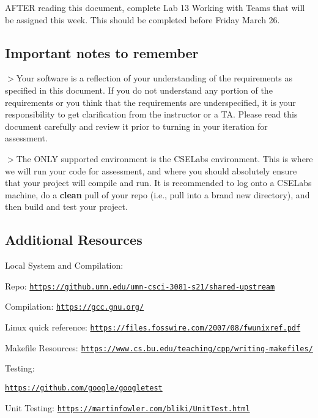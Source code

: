 A\+F\+T\+ER reading this document, complete Lab 13 Working with Teams that will be assigned this week. This should be completed before Friday March 26.





\subsection*{Important notes to remember}

$>$Your software is a reflection of your understanding of the requirements as specified in this document. If you do not understand any portion of the requirements or you think that the requirements are underspecified, it is your responsibility to get clarification from the instructor or a TA. Please read this document carefully and review it prior to turning in your iteration for assessment.

$>$The O\+N\+LY supported environment is the C\+S\+E\+Labs environment. This is where we will run your code for assessment, and where you should absolutely ensure that your project will compile and run. It is recommended to log onto a C\+S\+E\+Labs machine, do a {\bfseries clean} pull of your repo (i.\+e., pull into a brand new directory), and then build and test your project.





\subsection*{Additional Resources}

Local System and Compilation\+:
\begin{DoxyItemize}
\item Repo\+: \href{https://github.umn.edu/umn-csci-3081-s21/shared-upstream}{\tt https\+://github.\+umn.\+edu/umn-\/csci-\/3081-\/s21/shared-\/upstream}
\item Compilation\+: \href{https://gcc.gnu.org/}{\tt https\+://gcc.\+gnu.\+org/}
\item Linux quick reference\+: \href{https://files.fosswire.com/2007/08/fwunixref.pdf}{\tt https\+://files.\+fosswire.\+com/2007/08/fwunixref.\+pdf}
\item Makefile Resources\+: \href{https://www.cs.bu.edu/teaching/cpp/writing-makefiles/}{\tt https\+://www.\+cs.\+bu.\+edu/teaching/cpp/writing-\/makefiles/}
\end{DoxyItemize}

Testing\+:
\begin{DoxyItemize}
\item \href{https://github.com/google/googletest}{\tt https\+://github.\+com/google/googletest}
\item Unit Testing\+: \href{https://martinfowler.com/bliki/UnitTest.html}{\tt https\+://martinfowler.\+com/bliki/\+Unit\+Test.\+html}
\end{DoxyItemize}

